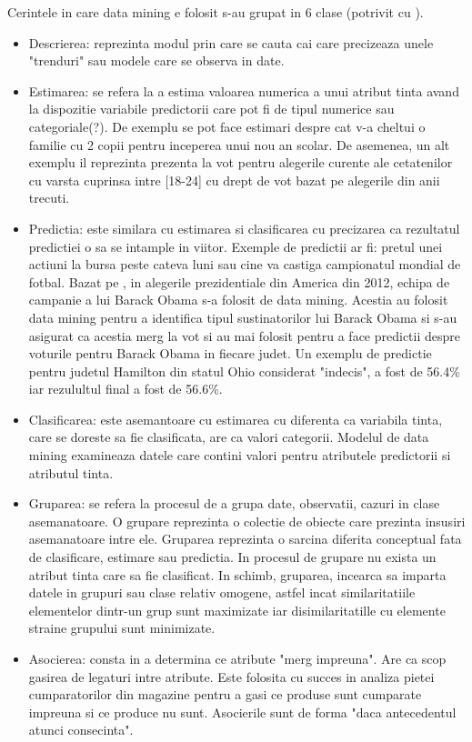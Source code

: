 Cerintele in care data mining e folosit s-au grupat in 6 clase (potrivit cu \cite{Disco}).
\begin{itemize}
\item Descrierea: reprezinta modul prin care se cauta cai care precizeaza unele "trenduri" sau modele care se observa in date.
\item Estimarea: se refera la a estima valoarea numerica a unui atribut tinta avand la dispozitie variabile predictorii care pot fi de tipul numerice sau categoriale(?). De exemplu se pot face estimari despre cat v-a cheltui o familie cu 2 copii pentru inceperea unui nou an scolar. De asemenea, un alt exemplu il reprezinta prezenta la vot pentru alegerile curente ale cetatenilor cu varsta cuprinsa intre [18-24] cu drept de vot bazat pe alegerile din anii trecuti.
\item Predictia: este similara cu estimarea si clasificarea cu precizarea ca rezultatul predictiei o sa se intample in viitor. Exemple de predictii ar fi: pretul unei actiuni la bursa peste cateva luni sau cine va castiga campionatul mondial de fotbal. Bazat pe \cite{Disco}, in alegerile prezidentiale din America din 2012, echipa de campanie a lui Barack Obama s-a folosit de data mining. Acestia au folosit data mining pentru a identifica tipul sustinatorilor lui Barack Obama si s-au asigurat ca acestia merg la vot si au mai folosit pentru a face predictii despre voturile pentru Barack Obama in fiecare judet. Un exemplu de predictie pentru judetul Hamilton din statul Ohio considerat "indecis", a fost de 56.4\% iar rezulultul final a fost de 56.6\%.
\item Clasificarea: este asemantoare cu estimarea cu diferenta ca variabila tinta, care se doreste sa fie clasificata, are ca valori categorii. Modelul de data mining examineaza datele care contini valori pentru atributele predictorii si atributul tinta.
\item Gruparea: se refera la procesul de a grupa date, observatii, cazuri in clase asemanatoare. O grupare reprezinta o colectie de obiecte care prezinta insusiri asemanatoare intre ele. Gruparea reprezinta o sarcina diferita conceptual fata de clasificare, estimare sau predictia. In procesul de grupare nu exista un atribut tinta care sa fie clasificat. In schimb, gruparea, incearca sa imparta datele in grupuri sau clase relativ omogene, astfel incat similaritatiile elementelor dintr-un grup sunt maximizate iar disimilaritatille cu elemente straine grupului sunt minimizate.
\item Asocierea: consta in a determina ce atribute "merg impreuna". Are ca scop gasirea de legaturi intre atribute. Este folosita cu succes in analiza pietei cumparatorilor din magazine pentru a gasi ce produse sunt cumparate impreuna si ce produce nu sunt. Asocierile sunt de forma "daca antecedentul atunci consecinta".
\end{itemize}
